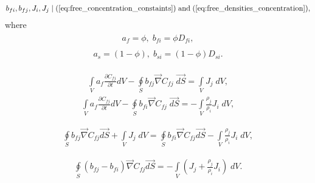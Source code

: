 \begin{eqnarray}
\label{eq:multiphase_diffusivity_densities}
b_{fi}, b_{fj}, J_{i}, J_{j} \mid (\ref{eq:free_concentration_constaints}) \; \text{and} \; (\ref{eq:free_densities_concentration}),
\end{eqnarray}
where
\begin{eqnarray}
\label{eq:multiphase_diffusivity_a_b_coeffs_free}
\begin{gathered}
a_{f} = \phi, \; b_{fi} = \phi D_{fi},
\end{gathered}
\end{eqnarray}
\begin{eqnarray}
\label{eq:multiphase_diffusivity_a_b_coeffs_adsorbed}
\begin{gathered}
a_{s} = \left(\mathit{1}-\phi\right), \; b_{si} = \left(\mathit{1}-\phi\right) D_{si}.
\end{gathered}
\end{eqnarray}

\begin{eqnarray}
\label{eq:multiphase_diffusivity_simplified_integral_3}
\int \limits_{V} a_{f} \frac{\partial C_{fj}}{\partial t} dV - \oint \limits_{S} b_{fj} \vec{\nabla}C_{fj} \; \vec{dS} = \int \limits_{V} J_{j} \; dV,
\end{eqnarray}
\begin{eqnarray}
\label{eq:multiphase_diffusivity_simplified_integral_4}
\int \limits_{V} a_{f} \frac{\partial C_{fj}}{\partial t} dV - \oint \limits_{S} b_{fi} \vec{\nabla}C_{fj} \; \vec{dS} = -\int \limits_{V} \frac{\rho_j}{\rho_i}J_{i} \; dV,
\end{eqnarray}

\begin{eqnarray}
\label{eq:multiphase_diffusivity_simplified_integral_5}
\oint \limits_{S} b_{fj} \vec{\nabla}C_{fj} \vec{dS}
+ \int \limits_{V} J_{j} \; dV
= \oint \limits_{S} b_{fi} \vec{\nabla}C_{fj} \vec{dS}
-\int \limits_{V} \frac{\rho_j}{\rho_i}J_{i} \; dV,
\end{eqnarray}

\begin{eqnarray}
\label{eq:multiphase_diffusivity_simplified_integral_6}
\oint \limits_{S} \left(b_{fj}-b_{fi}\right) \vec{\nabla}C_{fj} \vec{dS}
= -\int \limits_{V} \left(J_{j}+\frac{\rho_j}{\rho_i}J_{i}\right) \; dV.
\end{eqnarray}
